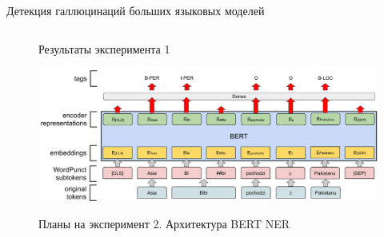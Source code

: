 \documentclass[8pt,pdf,hyperref={unicode}]{beamer}
\begin{document}
\begin{frame}{Детекция галлюцинаций больших языковых моделей}
\begin{columns}
\begin{column}{0.6\textwidth}
\begin{figure}
        \label{hist}
        \caption{Результаты эксперимента 1}
    \end{figure}
    \begin{figure}
        \centering
        \includegraphics[width=1\linewidth]{images/bert_architecture.png}
        \label{hist}
        \caption{Планы на эксперимент 2. Архитектура BERT NER}
    \end{figure}
\end{column}
\end{columns}


\end{frame}
\end{document}
